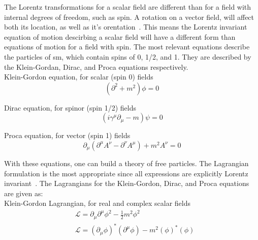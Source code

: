 \par The Lorentz transformations for a scalar field are different than
for a field with internal degrees of freedom, such as spin.  A
rotation on a vector field, will affect both its location, as well as
it's orentation~\cite{Peskin_Schroeder}.  This means the Lorentz
invariant equation of motion descirbing a scalar field will have a
different form than equations of motion for a field with spin.  The
most relevant equations describe the particles of \acrshort{sm}, which
contain spins of 0, 1/2, and 1.  They are described by the
Klein-Gordan, Dirac, and Proca equations respectively. \\

\noindent Klein-Gordon equation, for scalar (spin 0) fields 
\begin{equation}\label{eq:klein_gordon_eom}
(\partial^{2} + m^{2})\phi = 0  
\end{equation} 

\noindent Dirac equation, for spinor (spin 1/2) fields 
\begin{equation}\label{eq:dirac_eom}
(i\gamma^{\mu}\partial_{\mu} - m)\psi = 0 
\end{equation} 

\noindent Proca equation, for vector (spin 1) fields
\begin{equation}\label{eq:proca_eom}
\partial_{\mu}(\partial^{\mu}A^{\nu} - \partial^{\nu}A^{\mu}) + m^{2}A^{\nu}
= 0 
\end{equation} 

\par With these equations, one can build a theory of free particles.
The Lagrangian formulation is the most appropriate since all
expressions are explicitly Lorentz invariant~\cite{Peskin_Schroeder}.
The Lagrangians for the Klein-Gordon, Dirac, and Proca equations are
given as: \\

\noindent Klein-Gordon Lagrangian, for real and complex scalar fields
\begin{equation}\label{eq:klein_gordon_lagrangian}
\begin{aligned}
& \mathcal{L} = \partial_{\mu}\partial^{\mu}\phi^{2} - \frac{1}{2}m^{2}\phi^{2}  \\
& \mathcal{L} = (\partial_{\mu}\phi)^{\ast}(\partial^{\mu}\phi) - m^{2}(\phi)^{\ast}(\phi) 
\end{aligned}
\end{equation}

